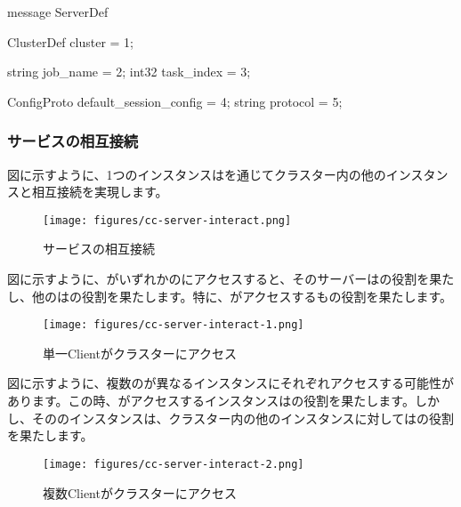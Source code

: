 \begin{content}
\begin{leftbar}
\begin{python}
message ServerDef {
  ClusterDef cluster = 1;
  
  string job_name = 2;
  int32 task_index = 3;

  ConfigProto default_session_config = 4;
  string protocol = 5;
}
\end{python}
\end{leftbar}

\subsubsection{サービスの相互接続}

図に示すように、1つのインスタンスはを通じてクラスター内の他のインスタンスと相互接続を実現します。

\begin{figure}[H]
\centering
\texttt{[image: figures/cc-server-interact.png]}
\caption{サービスの相互接続}
 \label{fig:cc-server-interact}
\end{figure}

図に示すように、がいずれかのにアクセスすると、そのサーバーはの役割を果たし、他のはの役割を果たします。特に、がアクセスするもの役割を果たします。

\begin{figure}[H]
\centering
\texttt{[image: figures/cc-server-interact-1.png]}
\caption{単一Clientがクラスターにアクセス}
 \label{fig:cc-server-interact-1}
\end{figure}

図に示すように、複数のが異なるインスタンスにそれぞれアクセスする可能性があります。この時、がアクセスするインスタンスはの役割を果たします。しかし、そののインスタンスは、クラスター内の他のインスタンスに対してはの役割を果たします。

\begin{figure}[H]
\centering
\texttt{[image: figures/cc-server-interact-2.png]}
\caption{複数Clientがクラスターにアクセス}
 \label{fig:cc-server-interact-2}
\end{figure}


\end{content}
